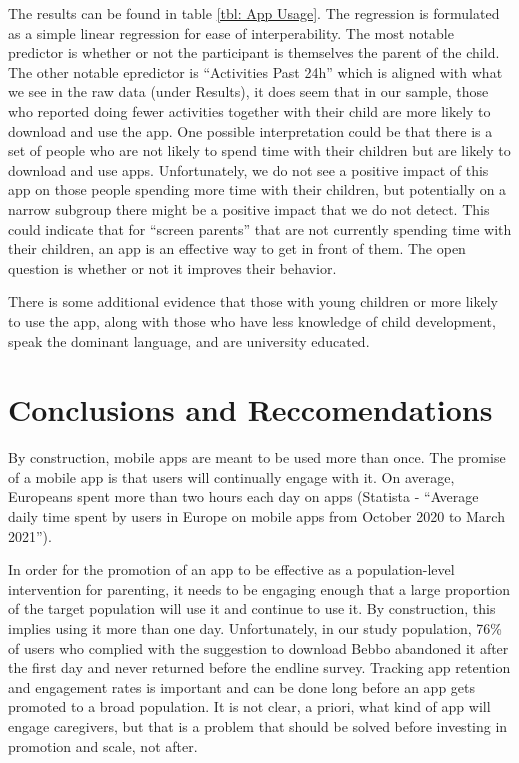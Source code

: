 \documentclass{article}
\begin{document}
The results can be found in table \ref{tbl: App Usage}. The regression is formulated as a simple linear regression for ease of interperability. The most notable predictor is whether or not the participant is themselves the parent of the child. The other notable epredictor is ``Activities Past 24h'' which is aligned with what we see in the raw data (under Results), it does seem that in our sample, those who reported doing fewer activities together with their child are more likely to download and use the app. One possible interpretation could be that there is a set of people who are not likely to spend time with their children but are likely to download and use apps. Unfortunately, we do not see a positive impact of this app on those people spending more time with their children, but potentially on a narrow subgroup there might be a positive impact that we do not detect. This could indicate that for ``screen parents'' that are not currently spending time with their children, an app is an effective way to get in front of them. The open question is whether or not it improves their behavior. 

There is some additional evidence that those with young children or more likely to use the app, along with those who have less knowledge of child development, speak the dominant language, and are university educated. 

 

\section{Conclusions and Reccomendations}

By construction, mobile apps are meant to be used more than once. The promise of a mobile app is that users will continually engage with it. On average, Europeans spent more than two hours each day on apps (Statista - ``Average daily time spent by users in Europe on mobile apps from October 2020 to March 2021''). 

In order for the promotion of an app to be effective as a population-level intervention for parenting, it needs to be engaging enough that a large proportion of the target population will use it and continue to use it. By construction, this implies using it more than one day. Unfortunately, in our study population, 76\% of users who complied with the suggestion to download Bebbo abandoned it after the first day and never returned before the endline survey. Tracking app retention and engagement rates is important and can be done long before an app gets promoted to a broad population. It is not clear, a priori, what kind of app will engage caregivers, but that is a problem that should be solved before investing in promotion and scale, not after. 
\end{document}
